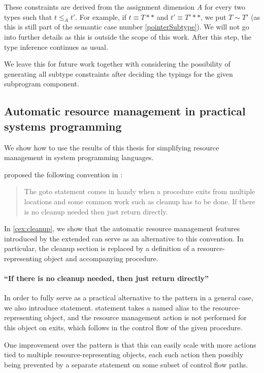 These constraints are derived from the assignment dimension $A$ for every two types such that $t \leq_A t'$. For example, if $t \equiv T\ast\ast$ and $t' \equiv T'\ast\ast$, we put $T \sim T'$ (as this is still part of the semantic case number \ref{pointerSubtype}). We will not go into further details as this is outside the scope of this work. After this step, the type inference continues as usual.

We leave this for future work together with considering the possibility of generating all subtype constraints after deciding the typings for the given subprogram component.

\subsection{Automatic resource management in practical systems programming}
\label{sec:autoC}

We show how to use the results of this thesis for simplifying resource management in system programming languages.

\citet{kernelStyle} proposed the following convention in :

\begin{quote}
  The goto statement comes in handy when a procedure exits from multiple locations and some common work such as cleanup has to be done. If there is no cleanup needed then just return directly.
\end{quote}

In \cref{cex:cleanup}, we show that the automatic resource management features introduced by the extended \cmm can serve as an alternative to this convention. In particular, the cleanup section is replaced by a definition of a resource-representing object and accompanying  procedure.

\paragraph{``If there is no cleanup needed, then just return directly''} In order to fully serve as a practical alternative to the  pattern in a general case, we also introduce  statement.  statement takes a named alias to the resource-representing object, and the resource management action is not performed for this object on exits, which follows in the control flow of the given procedure.

One improvement over the  pattern is that this can easily scale with more actions tied to multiple resource-representing objects, each such action then possibly being prevented by a separate  statement on some subset of control flow paths.

